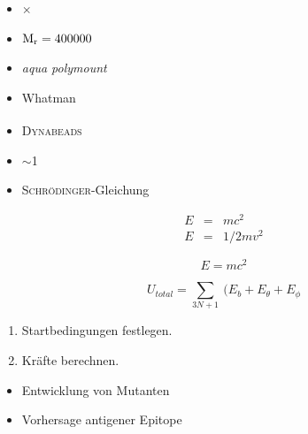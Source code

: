\begin{itemize}
    \item $\times$
    \item $\mbox{M\textsubscript{r}}=400000$
    \item \emph{aqua polymount}\textregistered
    \item Whatman\texttrademark{}
    \item \textsc{Dynabeads}\textsuperscript{\textregistered{}}
    \item $\sim$\unit{1}{\milli\gram\per\milli\litre}
    \item \textsc{Schrödinger}-Gleichung
\end{itemize}


\begin{eqnarray*}
E & = & mc^2	\\
E & = &	1/2mv^2
\end{eqnarray*}

\begin{equation}
E=mc^2
\end{equation}

\begin{displaymath}
U_{total}=\sum_{3N+1}~(E_{b}+E_{\theta}+E_{\phi}
\end{displaymath}



\begin{enumerate}
\item Startbedingungen festlegen.
\item Kräfte berechnen.
\end{enumerate}

\begin{itemize}
\item Entwicklung von Mutanten
\item Vorhersage antigener Epitope
\end{itemize}

